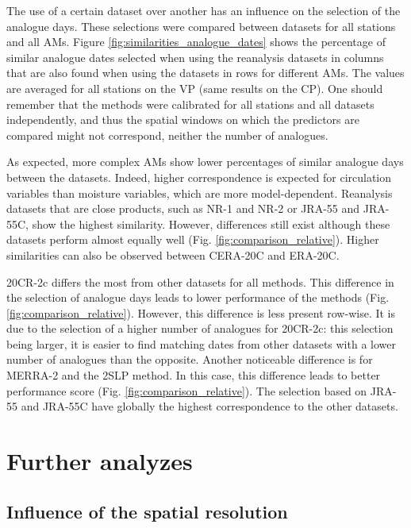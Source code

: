 \documentclass{ametsoc}
\begin{document}
The use of a certain dataset over another has an influence on the selection of the analogue days. These selections were compared between datasets for all stations and all AMs. Figure \ref{fig:similarities_analogue_dates} shows the percentage of similar analogue dates selected when using the reanalysis datasets in columns that are also found when using the datasets in rows for different AMs. The values are averaged for all stations on the VP (same results on the CP). One should remember that the methods were calibrated for all stations and all datasets independently, and thus the spatial windows on which the predictors are compared might not correspond, neither the number of analogues.

As expected, more complex AMs show lower percentages of similar analogue days between the datasets. Indeed, higher correspondence is expected for circulation variables than moisture variables, which are more model-dependent. Reanalysis datasets that are close products, such as NR-1 and NR-2 or JRA-55 and JRA-55C, show the highest similarity. However, differences still exist although these datasets perform almost equally well (Fig. \ref{fig:comparison_relative}). Higher similarities can also be observed between CERA-20C and ERA-20C.

20CR-2c differs the most from other datasets for all methods. This difference in the selection of analogue days leads to lower performance of the methods (Fig. \ref{fig:comparison_relative}). However, this difference is less present row-wise. It is due to the selection of a higher number of analogues for 20CR-2c: this selection being larger, it is easier to find matching dates from other datasets with a lower number of analogues than the opposite. Another noticeable difference is for MERRA-2 and the 2SLP method. In this case, this difference leads to better performance score (Fig. \ref{fig:comparison_relative}). The selection based on JRA-55 and JRA-55C have globally the highest correspondence to the other datasets.


\section{Further analyzes}
\label{sec:analyzes}

\subsection{Influence of the spatial resolution}
\label{sec:resolution}
\end{document}
